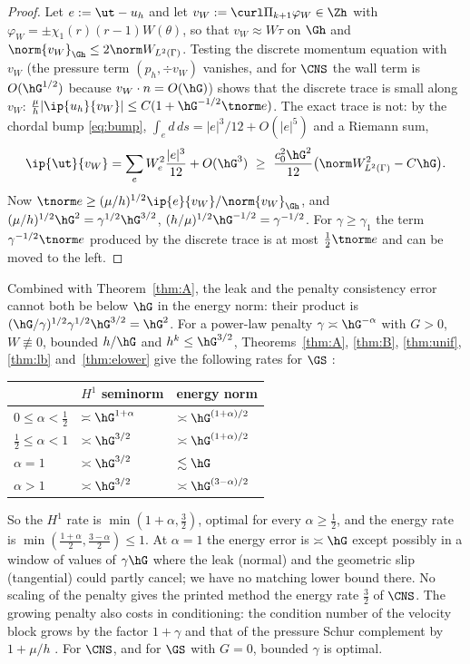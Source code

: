 \begin{proof}
Let $e:=\ut-u_h$ and let $v_W:=\curl\Pi_{k+1}\varphi_W\in\Zh$ with $\varphi_W=\pm\chi_1(r)(r-1)W(\theta)$, so that $v_W\approx W\tau$ on $\Gh$ and $\norm{v_W}_{\Gh}\le2\norm W_{L^2(\Gamma)}$. Testing the discrete momentum equation with $v_W$ (the pressure term $(p_h,\div v_W)$ vanishes, and for $\CNS$ the wall term is $O(\hG^{1/2})$ because $v_W\cdot n=O(\hG)$) shows that the discrete trace is small along $v_W$: $\frac\mu h|\ip{u_h}{v_W}|\le C(1+\hG^{-1/2}\tnorm e)$. The exact trace is not: by the chordal bump \eqref{eq:bump}, $\int_ed\,ds=|e|^3/12+O(|e|^5)$ and a Riemann sum,
\[
\ip{\ut}{v_W}=\sum_eW_e^2\frac{|e|^3}{12}+O(\hG^3)\ \ge\ \frac{c_0^2\hG^2}{12}\bigl(\norm W^2_{L^2(\Gamma)}-C\hG\bigr).
\]
Now $\tnorm e\ge(\mu/h)^{1/2}\ip{e}{v_W}/\norm{v_W}_{\Gh}$, and $(\mu/h)^{1/2}\hG^2=\gamma^{1/2}\hG^{3/2}$, $(h/\mu)^{1/2}\hG^{-1/2}=\gamma^{-1/2}$. For $\gamma\ge\gamma_1$ the term $\gamma^{-1/2}\tnorm e$ produced by the discrete trace is at most $\frac12\tnorm e$ and can be moved to the left.
\end{proof}
Combined with Theorem~\ref{thm:A}, the leak and the penalty consistency error cannot both be below $\hG$ in the energy norm: their product is $(\hG/\gamma)^{1/2}\gamma^{1/2}\hG^{3/2}=\hG^2$. For a power-law penalty $\gamma\asymp\hG^{-\alpha}$ with $G>0$, $W\not\equiv0$, bounded $h/\hG$ and $h^k\le\hG^{3/2}$, Theorems~\ref{thm:A}, \ref{thm:B}, \ref{thm:unif}, \ref{thm:lb} and~\ref{thm:elower} give the following rates for $\GS$ \cite{PadhiExt}:
\begin{center}\small
\begin{tabular}{lll}
\toprule
& $H^1$ seminorm & energy norm\\
\midrule
$0\le\alpha<\frac12$ & $\asymp\hG^{1+\alpha}$ & $\asymp\hG^{(1+\alpha)/2}$\\
$\frac12\le\alpha<1$ & $\asymp\hG^{3/2}$ & $\asymp\hG^{(1+\alpha)/2}$\\
$\alpha=1$ & $\asymp\hG^{3/2}$ & $\lesssim\hG$\\
$\alpha>1$ & $\asymp\hG^{3/2}$ & $\asymp\hG^{(3-\alpha)/2}$\\
\bottomrule
\end{tabular}
\end{center}
So the $H^1$ rate is $\min(1+\alpha,\frac32)$, optimal for every $\alpha\ge\frac12$, and the energy rate is $\min(\frac{1+\alpha}2,\frac{3-\alpha}2)\le1$. At $\alpha=1$ the energy error is $\asymp\hG$ except possibly in a window of values of $\gamma\hG$ where the leak (normal) and the geometric slip (tangential) could partly cancel; we have no matching lower bound there. No scaling of the penalty gives the printed method the energy rate $\frac32$ of $\CNS$. The growing penalty also costs in conditioning: the condition number of the velocity block grows by the factor $1+\gamma$ and that of the pressure Schur complement by $1+\mu/h$ \cite{PadhiExt}. For $\CNS$, and for $\GS$ with $G=0$, bounded $\gamma$ is optimal.

